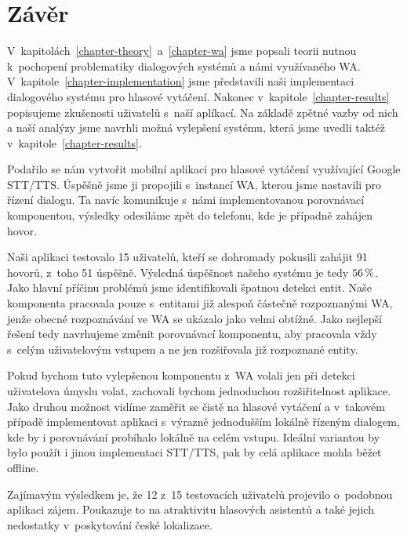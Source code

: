 \chapter*{Závěr}

V~kapitolách~\ref{chapter-theory}~a~\ref{chapter-wa} jsme popsali teorii nutnou
k~pochopení problematiky dialogových systémů a námi využívaného WA.
V~kapitole~\ref{chapter-implementation} jsme představili naši
implementaci dialogového systému pro hlasové vytáčení.
Nakonec v~kapitole~\ref{chapter-results} popisujeme zkušenosti
uživatelů s~naší aplíkací. Na základě zpětné vazby od nich a naší analýzy jsme navrhli možná
vylepšení systému, která jsme uvedli taktéž v~kapitole~\ref{chapter-results}.

Podařilo se nám vytvořit mobilní aplikaci pro hlasové vytáčení využívající
Google STT/TTS. Úspěšně jsme ji propojili
s~instancí WA, kterou jsme nastavili pro řízení dialogu. Ta navíc komunikuje s~námi
implementovanou porovnávací komponentou, výsledky odesíláme zpět do telefonu,
kde je případně zahájen hovor.

Naši aplikaci testovalo 15 uživatelů, kteří se dohromady pokusili zahájit 91 hovorů,
z~toho 51 úspěšně. Výsledná úspěšnost našeho systému je tedy \(56\,\rm \%\).
Jako hlavní příčinu problémů jsme identifikovali špatnou detekci entit.
Naše komponenta pracovala pouze s~entitami již alespoň částečně rozpoznanými
WA, jenže obecné rozpoznávání ve WA se ukázalo jako velmi obtížné. Jako nejlepší
řešení tedy navrhujeme změnit porovnávací komponentu, aby pracovala vždy s~celým
uživatelovým vstupem a ne jen rozšiřovala již rozpoznané entity.

Pokud bychom tuto vylepšenou komponentu z~WA volali jen při detekci uživatelova
úmyslu volat, zachovali bychom jednoduchou rozšiřitelnost aplikace. Jako
druhou možnost vidíme zaměřit se čistě na hlasové vytáčení a v~takovém
případě implementovat aplikaci s~výrazně jednodušším lokálně řízeným
dialogem, kde by i porovnávání probíhalo lokálně na celém vstupu. Ideální
variantou by bylo použít i jinou implementaci STT/TTS, pak by
celá aplikace mohla běžet offline.

Zajímavým výsledkem je, že 12 z~15 testovacích uživatelů projevilo o~podobnou
aplikaci zájem. Poukazuje to na atraktivitu hlasových asistentů
a také jejich nedostatky v~poskytování české lokalizace.